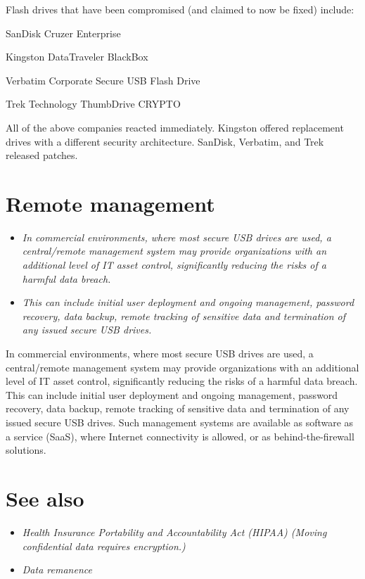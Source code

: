 Flash drives that have been compromised (and claimed to now be fixed)
include:

SanDisk Cruzer Enterprise

Kingston DataTraveler BlackBox

Verbatim Corporate Secure USB Flash Drive

Trek Technology ThumbDrive CRYPTO

All of the above companies reacted immediately. Kingston offered
replacement drives with a different security architecture. SanDisk,
Verbatim, and Trek released patches.

\section{Remote management}\label{remote-management}

\begin{itemize}
\item
  \emph{In commercial environments, where most secure USB drives are
  used, a central/remote management system may provide organizations
  with an additional level of IT asset control, significantly reducing
  the risks of a harmful data breach.}
\item
  \emph{This can include initial user deployment and ongoing management,
  password recovery, data backup, remote tracking of sensitive data and
  termination of any issued secure USB drives.}
\end{itemize}

In commercial environments, where most secure USB drives are used, a
central/remote management system may provide organizations with an
additional level of IT asset control, significantly reducing the risks
of a harmful data breach. This can include initial user deployment and
ongoing management, password recovery, data backup, remote tracking of
sensitive data and termination of any issued secure USB drives. Such
management systems are available as software as a service (SaaS), where
Internet connectivity is allowed, or as behind-the-firewall solutions.

\section{See also}\label{see-also}

\begin{itemize}
\item
  \emph{Health Insurance Portability and Accountability Act (HIPAA)
  (Moving confidential data requires encryption.)}
\item
  \emph{Data remanence}
\end{itemize}


